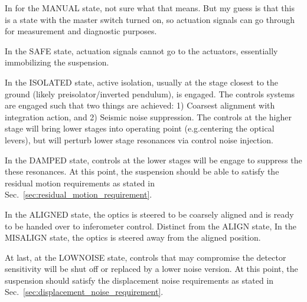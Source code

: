 In for the MANUAL state, not sure what that means.
But my guess is that this is a state with the master switch turned on, so actuation signals can go through for measurement and diagnostic purposes.

In the SAFE state, actuation signals cannot go to the actuators, essentially immobilizing the suspension.

In the ISOLATED state, active isolation, usually at the stage closest to the ground (likely preisolator/inverted pendulum), is engaged.
The controls systems are engaged such that two things are achieved: 1) Coarsest alignment with integration action, and 2) Seismic noise suppression.
The controls at the higher stage will bring lower stages into operating point (e.g.centering the optical levers), but will perturb lower stage resonances via control noise injection.

In the DAMPED state, controls at the lower stages will be engage to suppress the these resonances.
At this point, the suspension should be able to satisfy the residual motion requirements as stated in Sec.~\ref{sec:residual_motion_requirement}.

In the ALIGNED state, the optics is steered to be coarsely aligned and is ready to be handed over to inferometer control.
Distinct from the ALIGN state, In the MISALIGN state, the optics is steered away from the aligned position.

At last, at the LOWNOISE state, controls that may compromise the detector sensitivity will be shut off or replaced by a lower noise version.
At this point, the suspension should satisfy the displacement noise requirements as stated in Sec.~\ref{sec:displacement_noise_requirement}.


